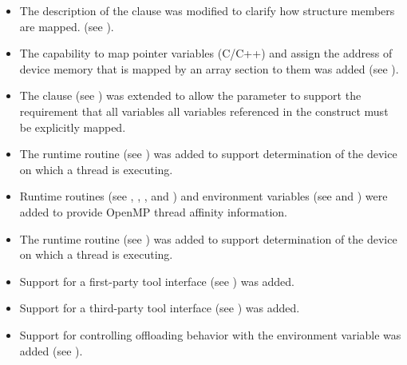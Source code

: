 \begin{itemize}
\item The description of the  clause was modified to clarify how
      structure members are mapped. (see ).

\item The capability to map pointer variables (C/C++) and assign the
      address of device memory that is mapped by an array section to them
      was added (see ).

\item The  clause (see )
      was extended to allow the  parameter to support the
      requirement that all variables all variables referenced in the
      construct must be explicitly mapped.

\item The  runtime routine
      (see ) was added to support
      determination of the device on which a thread is executing.

\item Runtime routines (see ,
      ,
      , and
      ) and environment variables
      (see  and
      ) were added to provide OpenMP
      thread affinity information.

\item The  runtime routine
      (see ) was added to support
      determination of the device on which a thread is executing.

\item Support for a first-party tool interface (see
      ) was added.

\item Support for a third-party tool interface (see
      ) was added.

\item Support for controlling offloading behavior with the
       environment variable was added
      (see  ).
\end{itemize}


